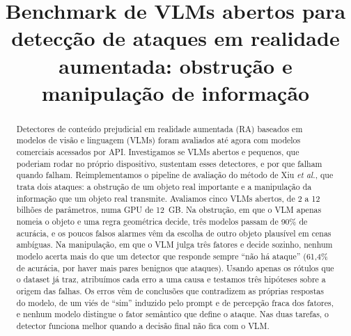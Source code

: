 \documentclass[conference]{IEEEtran}
\begin{document}
\title{Benchmark de VLMs abertos para detecção de ataques em realidade aumentada: obstrução e
manipulação de informação}

\author{
\and
{}
}

\maketitle

\begin{abstract}
Detectores de conteúdo prejudicial em realidade aumentada (RA) baseados em modelos de visão e linguagem
(VLMs) foram avaliados até agora com modelos comerciais acessados por API. Investigamos se VLMs
abertos e pequenos, que poderiam rodar no próprio dispositivo, sustentam esses detectores, e por que
falham quando falham. Reimplementamos o pipeline de avaliação do método de Xiu \emph{et al.}, que trata
dois ataques: a obstrução de um objeto real importante e a manipulação da informação que um objeto real
transmite. Avaliamos cinco VLMs abertos, de 2 a 12 bilhões de parâmetros, numa GPU de 12~GB. Na
obstrução, em que o VLM apenas nomeia o objeto e uma regra geométrica decide, três modelos passam de
90\% de acurácia, e os poucos falsos alarmes vêm da escolha de outro objeto plausível em cenas
ambíguas. Na manipulação, em que o VLM julga três fatores e decide sozinho, nenhum modelo acerta mais do
que um detector que responde sempre ``não há ataque'' (61,4\% de acurácia, por haver mais pares
benignos que ataques). Usando apenas os rótulos que o dataset já traz, atribuímos cada erro a uma causa
e testamos três hipóteses sobre a origem das falhas. Os erros vêm de conclusões que contradizem as
próprias respostas do modelo, de um viés de ``sim'' induzido pelo prompt e de percepção fraca dos
fatores, e nenhum modelo distingue o fator semântico que define o ataque. Nas duas tarefas, o detector
funciona melhor quando a decisão final não fica com o VLM.
\end{abstract}
\end{document}
